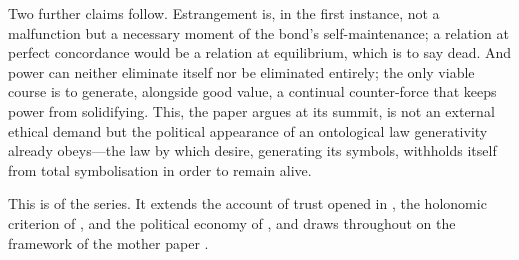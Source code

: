 Two further claims follow. Estrangement is, in the first instance, not a malfunction but a necessary moment of the bond's self-maintenance; a relation at perfect concordance would be a relation at equilibrium, which is to say dead. And power can neither eliminate itself nor be eliminated entirely; the only viable course is to generate, alongside good value, a continual counter-force that keeps power from solidifying.  This, the paper argues at its summit, is not an external ethical demand but the political appearance of an ontological law generativity already obeys---the law by which desire, generating its symbols, withholds itself from total symbolisation in order to remain alive.

This is  of the series. It extends the account of trust opened in  \parencite{paperxiii}, the holonomic criterion of  \parencite{paperix}, and the political economy of , and draws throughout on the framework of the mother paper \parencite{wan2024grb}.
